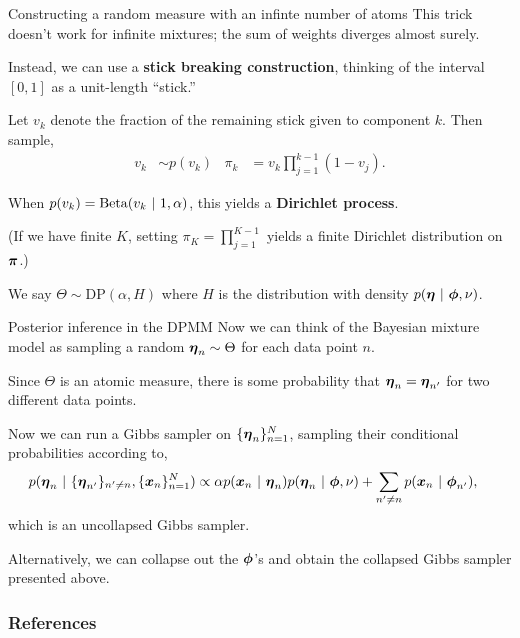 \documentclass[aspectratio=169]{beamer}
\begin{document}
\begin{frame}{Constructing a random measure with an infinte number of atoms}
This trick doesn't work for infinite mixtures; the sum of weights diverges almost surely.

Instead, we can use a \textbf{stick breaking construction}, thinking of the interval $[0,1]$ as a unit-length ``stick.''

Let $v_k$ denote the fraction of the remaining stick given to component $k$. Then sample,
\begin{align}
    v_k &\sim p(v_k) & \pi_k &= v_k \prod_{j=1}^{k-1} (1 - v_j).
\end{align}

When $p(v_k) = \mathrm{Beta}(v_k ~\vert~ 1, \alpha)$, this yields a \textbf{Dirichlet process}. 

(If we have finite $K$, setting $\pi_K = \prod_{j=1}^{K-1}$ yields a finite Dirichlet distribution on $\boldsymbol{\pi}$.)

We say $\Theta \sim \mathrm{DP}(\alpha, H)$ where $H$ is the distribution with density $p(\boldsymbol{\eta} ~\vert~ \boldsymbol{\phi}, \nu)$.


\end{frame}

\begin{frame}{Posterior inference in the DPMM}
    Now we can think of the Bayesian mixture model as sampling a random $\boldsymbol{\eta}_n \sim \Theta$ for each data point $n$. 
    
    Since $\Theta$ is an atomic measure, there is some probability that $\boldsymbol{\eta}_n = \boldsymbol{\eta}_{n'}$ for two different data points.
    
    Now we can run a Gibbs sampler on $\{\boldsymbol{\eta}_n\}_{n=1}^N$, sampling their conditional probabilities according to,
    \begin{align}
        p(\boldsymbol{\eta}_n ~\vert~ \{\boldsymbol{\eta}_{n'}\}_{n' \neq n}, \{\boldsymbol{x}_n\}_{n=1}^N) &\propto \alpha p(\boldsymbol{x}_n ~\vert~ \boldsymbol{\eta}_n) p(\boldsymbol{\eta}_n ~\vert~ \boldsymbol{\phi}, \nu) + \sum_{n' \neq n} p(\boldsymbol{x}_n ~\vert~ \boldsymbol{\phi}_{n'}), 
    \end{align}
    which is an uncollapsed Gibbs sampler. 
    
    Alternatively, we can collapse out the $\boldsymbol{\phi}$'s and obtain the collapsed Gibbs sampler presented above.
\end{frame}

\begin{frame}[t,allowframebreaks]
        \frametitle{References}
        
        
\end{frame}
\end{document}
